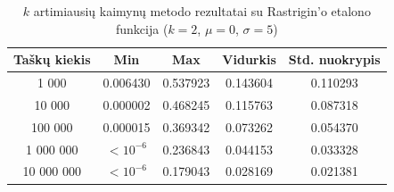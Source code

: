 \begin{table}[H]
    \centering
    \begin{tabular}{|c|c|c|c|c|}
        \hline
        \textbf{Taškų kiekis} & \textbf{Min} & \textbf{Max} & \textbf{Vidurkis} & \textbf{Std. nuokrypis} \\ \hline
        1 000        & 0.006430 & 0.537923 & 0.143604 & 0.110293 \\ \hline
        10 000       & 0.000002 & 0.468245 & 0.115763 & 0.087318 \\ \hline
        100 000      & 0.000015 & 0.369342 & 0.073262 & 0.054370 \\ \hline
        1 000 000    & $<10^{-6}$ & 0.236843 & 0.044153 & 0.033328 \\ \hline
        10 000 000   & $<10^{-6}$ & 0.179043 & 0.028169 & 0.021381 \\ \hline
    \end{tabular}
    \caption{$k$ artimiausių kaimynų metodo rezultatai su Rastrigin'o etalono funkcija ($k = 2$, $\mu = 0$, $\sigma = 5$)}
\end{table}
